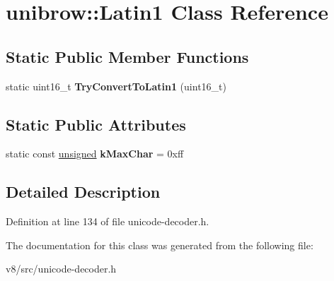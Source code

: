 \hypertarget{classunibrow_1_1Latin1}{}\section{unibrow\+:\+:Latin1 Class Reference}
\label{classunibrow_1_1Latin1}
\subsection*{Static Public Member Functions}
\begin{DoxyCompactItemize}
\item 
\mbox{\label{classunibrow_1_1Latin1_a0a58350e74aa2a5435d0b2327134c6ed}} 
static uint16\+\_\+t {\bfseries Try\+Convert\+To\+Latin1} (uint16\+\_\+t)
\end{DoxyCompactItemize}
\subsection*{Static Public Attributes}
\begin{DoxyCompactItemize}
\item 
\mbox{\label{classunibrow_1_1Latin1_aa184fb4edf2b3decc925d3968febe65e}} 
static const \mbox{\hyperlink{classunsigned}{unsigned}} {\bfseries k\+Max\+Char} = 0xff
\end{DoxyCompactItemize}


\subsection{Detailed Description}


Definition at line 134 of file unicode-\/decoder.\+h.



The documentation for this class was generated from the following file\+:\begin{DoxyCompactItemize}
\item 
v8/src/unicode-\/decoder.\+h\end{DoxyCompactItemize}
